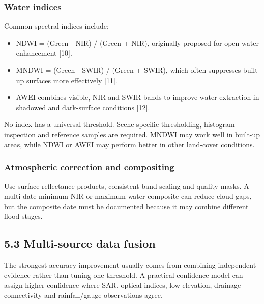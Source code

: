 \documentclass[11pt,a4paper]{article}
\begin{document}
\subsubsection{Water indices}\label{water-indices}

Common spectral indices include:

\begin{itemize}
\item
  NDWI = (Green - NIR) / (Green + NIR), originally proposed for open-water enhancement {[}10{]}.
\item
  MNDWI = (Green - SWIR) / (Green + SWIR), which often suppresses built-up surfaces more effectively {[}11{]}.
\item
  AWEI combines visible, NIR and SWIR bands to improve water extraction in shadowed and dark-surface conditions {[}12{]}.
\end{itemize}

No index has a universal threshold. Scene-specific thresholding, histogram inspection and reference samples are required. MNDWI may work well in built-up areas, while NDWI or AWEI may perform better in other land-cover conditions.

\subsubsection{Atmospheric correction and compositing}\label{atmospheric-correction-and-compositing}

Use surface-reflectance products, consistent band scaling and quality masks. A multi-date minimum-NIR or maximum-water composite can reduce cloud gaps, but the composite date must be documented because it may combine different flood stages.

\subsection{5.3 Multi-source data fusion}\label{multi-source-data-fusion}

The strongest accuracy improvement usually comes from combining independent evidence rather than tuning one threshold. A practical confidence model can assign higher confidence where SAR, optical indices, low elevation, drainage connectivity and rainfall/gauge observations agree.
\end{document}
